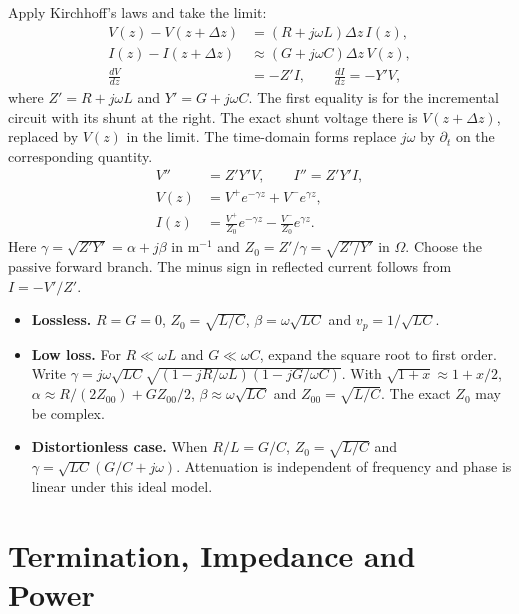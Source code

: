 \documentclass[12pt,a4paper]{article}
\begin{document}
Apply Kirchhoff's laws and take the limit:
\[
\begin{aligned}
V(z)-V(z+\Delta z)&=(R+j\omega L)\Delta z\,I(z),\\
I(z)-I(z+\Delta z)&\approx(G+j\omega C)\Delta z\,V(z),\\
\frac{dV}{dz}&=-Z'I,\qquad \frac{dI}{dz}=-Y'V ,
\end{aligned}
\]
where $Z'=R+j\omega L$ and $Y'=G+j\omega C$. The first equality is for the incremental circuit with its shunt at the right. The exact shunt voltage there is $V(z+\Delta z)$, replaced by $V(z)$ in the limit. The time-domain forms replace $j\omega$ by $\partial_t$ on the corresponding quantity.
\[
\begin{aligned}
V''&=Z'Y'V,\qquad I''=Z'Y'I,\\
V(z)&=V^+e^{-\gamma z}+V^-e^{\gamma z},\\
I(z)&=\frac{V^+}{Z_0}e^{-\gamma z}-\frac{V^-}{Z_0}e^{\gamma z}.
\end{aligned}
\]
Here $\gamma=\sqrt{Z'Y'}=\alpha+j\beta$ in $\mathrm{m^{-1}}$ and $Z_0=Z'/\gamma=\sqrt{Z'/Y'}$ in $\Omega$. Choose the passive forward branch. The minus sign in reflected current follows from $I=-V'/Z'$.
\begin{itemize}[leftmargin=*,itemsep=3pt]
\item \textbf{Lossless.} $R=G=0$, $Z_0=\sqrt{L/C}$, $\beta=\omega\sqrt{LC}$ and $v_p=1/\sqrt{LC}$.
\item \textbf{Low loss.} For $R\ll\omega L$ and $G\ll\omega C$, expand the square root to first order. Write $\gamma=j\omega\sqrt{LC}\sqrt{(1-jR/\omega L)(1-jG/\omega C)}$. With $\sqrt{1+x}\approx1+x/2$, $\alpha\approx R/(2Z_{00})+GZ_{00}/2$, $\beta\approx\omega\sqrt{LC}$ and $Z_{00}=\sqrt{L/C}$. The exact $Z_0$ may be complex.
\item \textbf{Distortionless case.} When $R/L=G/C$, $Z_0=\sqrt{L/C}$ and $\gamma=\sqrt{LC}(G/C+j\omega)$. Attenuation is independent of frequency and phase is linear under this ideal model.
\end{itemize}

\section{Termination, Impedance and Power}
\end{document}
